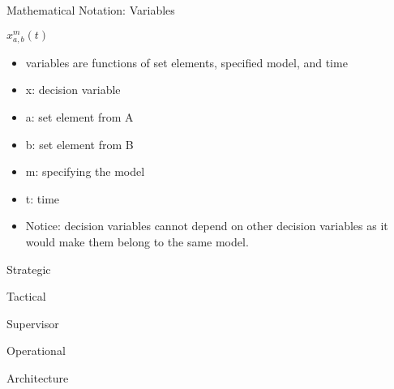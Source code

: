 \documentclass{beamer}
\begin{document}
\begin{frame}{}
    \begin{block}{Mathematical Notation: Variables}
	\par
	$ x_{a, b}^{m}(t) $ \\ 
	\begin{itemize}
		\item variables are functions of set elements, specified model, and time
		\item x: decision variable
		\item a: set element from A
		\item b: set element from B
		\item m: specifying the model
		\item t: time
		\item Notice: decision variables cannot depend on other decision variables as it would make them belong to the same model.
	\end{itemize}
    \end{block}
\end{frame}

\begin{frame}[t]{Strategic}
\end{frame}

\begin{frame}[t]{Tactical}
\end{frame}

\begin{frame}[t]{Supervisor}
\end{frame}

\begin{frame}[t]{Operational}
\end{frame}

\begin{frame}[t]{Architecture}
\end{frame}
\end{document}
